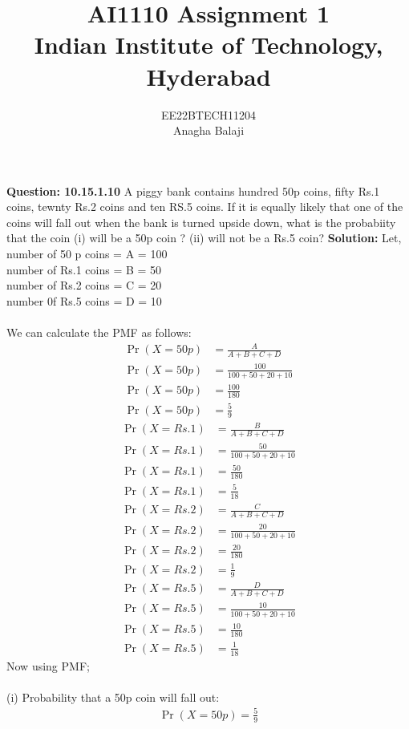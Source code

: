 \documentclass[journal,12pt,twocolumn]{IEEEtran}
\title{
AI1110 Assignment 1\\
  \Large Indian Institute of Technology, Hyderabad
}
\author{
  EE22BTECH11204\\[4pt]
  Anagha Balaji\\
}
\providecommand{\pr}[1]{\ensuremath{\Pr\left(#1\right)}}
\theoremstyle{remark}
\begin{document}
%
\maketitle
\textbf{Question: 10.15.1.10}
A piggy bank contains hundred 50p coins, fifty Rs.1 coins, tewnty Rs.2 coins and ten RS.5 coins. If it is equally likely that one of the coins will fall out when the bank is turned upside down, what is the probabiity that the coin (i) will be a 50p coin ? (ii) will not be a Rs.5 coin?
\textbf{Solution: }
Let,\\
number of 50 p coins = A =  100\\
number of Rs.1 coins = B = 50\\
number of Rs.2 coins = C = 20\\
number 0f Rs.5 coins = D = 10\\
\\
We can calculate the PMF as follows:
\begin{align}
\pr{X=50p} &= \frac{A}{A+B+C+D}\\
\pr{X=50p} &= \frac{100}{100+50+20+10}\\
\pr{X=50p} &= \frac{100}{180}\\
\pr{X=50p} &= \frac{5}{9}
\end{align}
\begin{align}
\pr{X=Rs.1} &= \frac{B}{A+B+C+D}\\
\pr{X=Rs.1} &= \frac{50}{100+50+20+10}\\
\pr{X=Rs.1} &= \frac{50}{180}\\
\pr{X=Rs.1} &= \frac{5}{18}
\end{align}
\begin{align}
\pr{X=Rs.2} &= \frac{C}{A+B+C+D}\\
\pr{X=Rs.2} &= \frac{20}{100+50+20+10}\\
\pr{X=Rs.2} &= \frac{20}{180}\\
\pr{X=Rs.2} &= \frac{1}{9}
\end{align}
\begin{align}
\pr{X=Rs.5} &= \frac{D}{A+B+C+D}\\
\pr{X=Rs.5} &= \frac{10}{100+50+20+10}\\
\pr{X=Rs.5} &= \frac{10}{180}\\
\pr{X=Rs.5} &= \frac{1}{18}
\end{align}
Now using PMF;\\
\\
(i) Probability that a 50p coin will fall out:\\
\begin{align}
\pr{X=50p} = \frac{5}{9}
\end{align}
\end{document}
